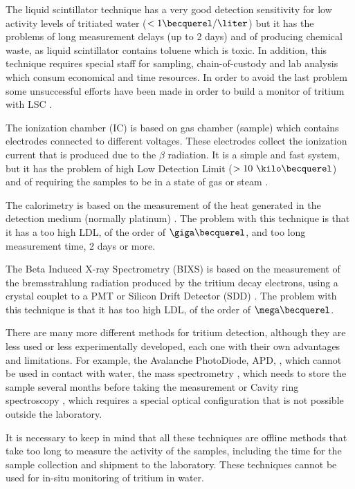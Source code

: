 The liquid scintillator technique has a very good detection sensitivity for low activity levels of tritiated water ($<1\becquerel/\liter$) \cite{0.6Bq_L} but it has the problems of long measurement delays (up to 2 days) and of producing chemical waste, as liquid scintillator contains toluene which is toxic. In addition, this technique requires special staff for sampling, chain-of-custody and lab analysis which consum economical and time resources. In order to avoid the last problem some unsuccessful efforts have been made in order to build a monitor of tritium with LSC \cite{OnlineLSC}. 

The ionization chamber (IC) is based on gas chamber (sample) which contains electrodes connected to different voltages. These electrodes collect the ionization current that is produced due to the $\beta$ radiation. It is a simple and fast system, but it has the problem of high Low Detection Limit ($> 10~\kilo\becquerel$) and of requiring the samples to be in a state of gas or steam \cite{IonizationChamber1, IonizationChamber2}.

The calorimetry is based on the measurement of the heat generated in the detection medium (normally platinum) \cite{Calorimeter1, Calorimeter2}. The problem with this technique is that it has a too high LDL, of the order of $\giga\becquerel$, and too long measurement time, 2 days or more.

The Beta Induced X-ray Spectrometry (BIXS) is based on the measurement of the bremsstrahlung radiation produced by the tritium decay electrons, using a  crystal couplet to a PMT  \cite{XRays1, XRays2} or Silicon Drift Detector (SDD) \cite{Bremstrahlung}. The problem with this technique is that it has too high LDL, of the order of $\mega\becquerel$.

There are many more different methods for tritium detection, although they are less used or less experimentally developed, each one with their own advantages and limitations. For example, the Avalanche PhotoDiode, APD, \cite{APD}, which cannot be used in contact with water, the mass spectrometry \cite{Spectrometry}, which needs to store the sample several months before taking the measurement or Cavity ring spectroscopy \cite{Ring}, which requires a special optical configuration that is not possible outside the laboratory.

It is necessary to keep in mind that all these techniques are offline methods that take too long to measure the activity of the samples, including the time for the sample collection and shipment to the laboratory. These techniques cannot be used for in-situ monitoring of tritium in water.

